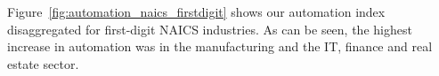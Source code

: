 \documentclass[11pt,a4paper]{article}
\newcommand*{\myalign}[2]{\multicolumn{1}{#1}{#2}} %
\begin{document}
Figure~\ref{fig:automation_naics_firstdigit} shows our automation index disaggregated for first-digit NAICS industries. As can be seen, the highest increase in automation was in the manufacturing and the IT, finance and real estate sector. 





\begin{comment}
\begin{table}
\begin{small}
  \begin{threeparttable}
    \caption{{\normalsize Examples of matched industries with patents, 2001}}
    \label{table:industry_linked2matches2001}
     \begin{tabular}{llr}
        \toprule
        \textbf{NAICS} & \textbf{Industry name} & \textbf{Number matches}  \tabularnewline
        \midrule
        334413	& Semiconductor and Related Device Manufacturing  & 6'867							\tabularnewline
        511219 	& Other Computer Related Services$^1$				& 6'418									\tabularnewline
        541512 	& Computer Systems Design Services				& 5'692									\tabularnewline
        \myalign{c}{\vdots}	& \myalign{c}{\vdots}			& 		\myalign{r}{\vdots}							\tabularnewline
        3335 	& Motor Vehicle Parts Manufacturing				& 2									\tabularnewline
        3363 	& Metalworking Machinery Manufacturing				& 1									\tabularnewline
        \myalign{c}{\vdots}	& \myalign{c}{\vdots}			& 		\myalign{r}{\vdots}							\tabularnewline
        3112 	& Grain and Oilseed Milling				& 0									\tabularnewline
        \myalign{c}{\vdots}	& \myalign{c}{\vdots}			& 		\myalign{r}{\vdots}							\tabularnewline
        \midrule
        	& Mean matches per industry  & 200.1							\tabularnewline
        	& Total matches linked to industries  & 94'046							\tabularnewline
        	& Total number of matches  & 231'514							\tabularnewline
        	& Share of matches linked to industries  & 41\%							\tabularnewline
        	& Total number of patents identified  & 184'172							\tabularnewline
        \bottomrule
     \end{tabular}
    \begin{tablenotes}
      \footnotesize
      \item $^1$includes software installation services and computer disaster recovery services 
      \item 	\textit{Source:} USPTO, Google and own calculations.
          \end{tablenotes}
  \end{threeparttable}
\end{small}
\end{table}
\end{comment}
\end{document}
